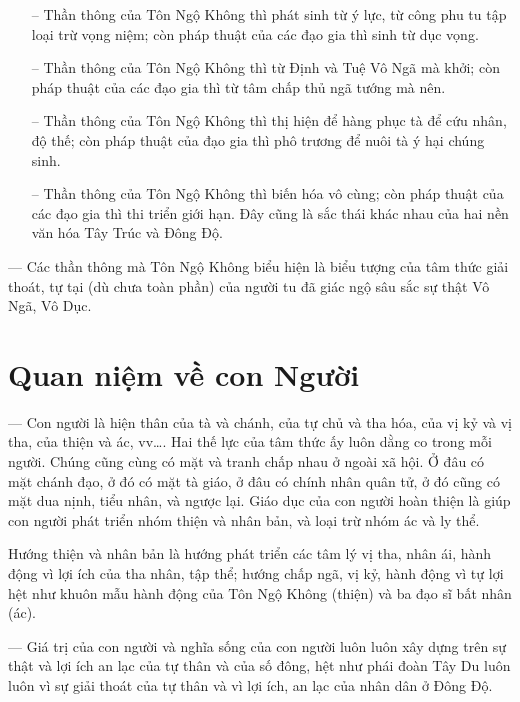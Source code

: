\begin{itemize}
    \item[–] Thần thông của Tôn Ngộ Không thì phát sinh từ ý lực, từ công phu tu tập loại trừ vọng niệm; còn pháp thuật của các đạo gia thì sinh từ dục vọng.

    \item[–] Thần thông của Tôn Ngộ Không thì từ Định và Tuệ Vô Ngã mà khởi; còn pháp thuật của các đạo gia thì từ tâm chấp thủ ngã tướng mà nên.

    \item[–] Thần thông của Tôn Ngộ Không thì thị hiện để hàng phục tà để cứu nhân, độ thế; còn pháp thuật của đạo gia thì phô trương để nuôi tà ý hại chúng sinh.

    \item[–] Thần thông của Tôn Ngộ Không thì biến hóa vô cùng; còn pháp thuật của các đạo gia thì thi triển giới hạn. Đây cũng là sắc thái khác nhau của hai nền văn hóa Tây Trúc và Đông Độ.
\end{itemize}

— Các thần thông mà Tôn Ngộ Không biểu hiện là biểu tượng của tâm thức giải thoát, tự tại (dù chưa toàn phần) của người tu đã giác ngộ sâu sắc sự thật Vô Ngã, Vô Dục.


\section{Quan niệm về con Người} %
\label{sec:44_45_con_nguoi}

— Con người là hiện thân của tà và chánh, của tự chủ và tha hóa, của vị kỷ và vị tha, của thiện và ác, vv\ldots. Hai thế lực của tâm thức ấy luôn dằng co trong mỗi người. Chúng cũng cùng có mặt và tranh chấp nhau ở ngoài xã hội. Ở đâu có mặt chánh đạo, ở đó có mặt tà giáo, ở đâu có chính nhân quân tử, ở đó cũng có mặt dua nịnh, tiểu nhân, và ngược lại. Giáo dục của con người hoàn thiện là giúp con người phát triển nhóm thiện và nhân bản, và loại trừ nhóm ác và ly thể.

Hướng thiện và nhân bản là hướng phát triển các tâm lý vị tha, nhân ái, hành động vì lợi ích của tha nhân, tập thể; hướng chấp ngã, vị kỷ, hành động vì tự lợi hệt như khuôn mẫu hành động của Tôn Ngộ Không (thiện) và ba đạo sĩ bất nhân (ác).

— Giá trị của con người và nghĩa sống của con người luôn luôn xây dựng trên sự thật và lợi ích an lạc của tự thân và của số đông, hệt như phái đoàn Tây Du luôn luôn vì sự giải thoát của tự thân và vì lợi ích, an lạc của nhân dân ở Đông Độ.

